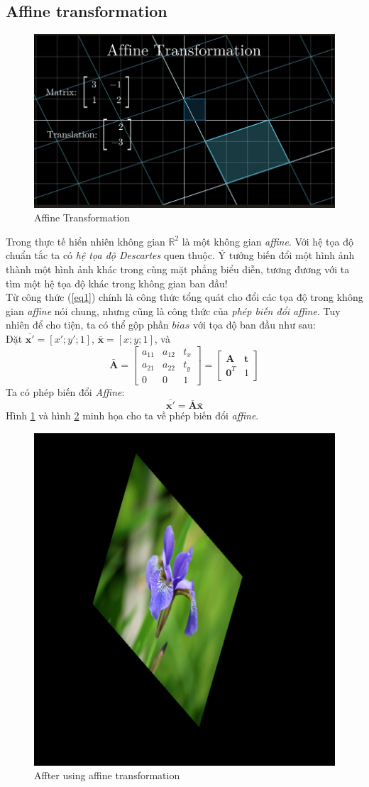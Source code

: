 \documentclass{article}
\begin{document}
\subsection{Affine transformation}
\begin{figure}[ht!]
    \centering
    \includegraphics[width = 0.8\linewidth]{fig4.png}
    \caption{Affine Transformation}
    \label{fig4}
\end{figure}
Trong thực tế hiển nhiên không gian $\mathbb{R}^{2}$ là một không gian \textit{affine}. Với hệ tọa độ chuẩn tắc ta có \textit{hệ tọa độ Descartes} quen thuộc. Ý tưởng biến đổi một hình ảnh thành một hình ảnh khác trong cùng mặt phẳng biểu diễn, tương đương với ta tìm một hệ tọa độ khác trong không gian ban đầu!\\
Từ công thức (\ref{eq1}) chính là công thức tổng quát cho đổi các tọa độ trong không gian \textit{affine} nói chung, nhưng cũng là công thức của \textit{phép biến đổi affine}. Tuy nhiên để cho tiện, ta có thể gộp phần $bias$ với tọa độ ban đầu như sau:\\
Đặt $\bar{\textbf{x}'} = [x'; y'; 1]$, $\bar{\textbf{x}} = [x; y; 1]$, và $$\bar{\textbf{A}} = \begin{bmatrix}
a_{11} & a_{12} & t_x\\
a_{21} & a_{22} & t_y\\
0 & 0 & 1
\end{bmatrix} = \begin{bmatrix}
\textbf{A} & \textbf{t}\\
\textbf{0}^{T} & 1
\end{bmatrix}
$$
Ta có phép biến đổi \textit{Affine}:
$$\bar{\textbf{x}'} = \bar{\textbf{A}} \bar{\textbf{x}} $$
Hình \ref{fig4} và hình \ref{fig8} minh họa cho ta về phép biến đổi \textit{affine}.
\begin{figure}[ht!]
    \centering
    \includegraphics[width = 0.5\linewidth]{fig8.png}
    \caption{Affter using affine transformation}
    \label{fig8}
\end{figure}
\end{document}
